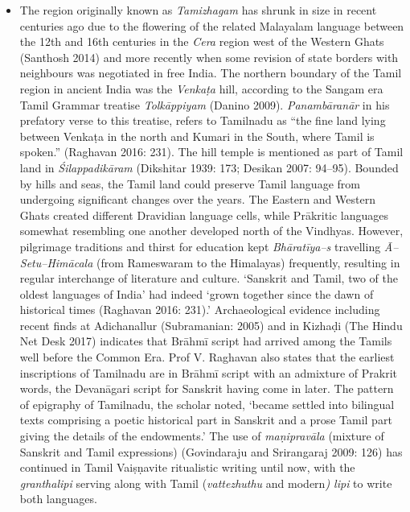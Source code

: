 \begin{itemize}
\item The region originally known as \textit{Tamizhagam} has shrunk in size in recent centuries ago due to the flowering of the related Malayalam language between the 12th and 16th centuries in the \textit{Cera} region west of the Western Ghats (Santhosh 2014) and more recently when some revision of state borders with neighbours was negotiated in free India. The northern boundary of the Tamil region in ancient India was the \textit{Venkaṭa} hill, according to the Sangam era Tamil Grammar treatise \textit{Tolkāppiyam} (Danino 2009). \textit{Panambāranār} in his prefatory verse to this treatise, refers to Tamilnadu as “the fine land lying between Venkaṭa in the north and Kumari in the South, where Tamil is spoken.” (Raghavan 2016: 231). The hill temple is mentioned as part of Tamil land in \textit{Śilappadikāram} (Dikshitar 1939: 173; Desikan 2007: 94–95). Bounded by hills and seas, the Tamil land could preserve Tamil language from undergoing significant changes over the years. The Eastern and Western Ghats created different Dravidian language cells, while Prākritic languages somewhat resembling one another developed north of the Vindhyas. However, pilgrimage traditions and thirst for education kept \textit{Bhāratīya–s} travelling \textit{Ā–Setu–Himācala} (from Rameswaram to the Himalayas) frequently, resulting in regular interchange of literature and culture. ‘Sanskrit and Tamil, two of the oldest languages of India’ had indeed ‘grown together since the dawn of historical times (Raghavan 2016: 231).’ Archaeological evidence including recent finds at Adichanallur (Subramanian: 2005) and in Kizhaḍi (The Hindu Net Desk 2017) indicates that Brāhmī script had arrived among the Tamils well before the Common Era. Prof V. Raghavan also states that the earliest inscriptions of Tamilnadu are in Brāhmī script with an admixture of Prakrit words, the Devanāgari script for Sanskrit having come in later. The pattern of epigraphy of Tamilnadu, the scholar noted, ‘became settled into bilingual texts comprising a poetic historical part in Sanskrit and a prose Tamil part giving the details of the endowments.’ The use of \textit{maṇipravāla} (mixture of Sanskrit and Tamil expressions) (Govindaraju and Srirangaraj 2009: 126) has continued in Tamil Vaiṣṇavite ritualistic writing until now, with the \textit{granthalipi} serving along with Tamil (\textit{vattezhuthu} and modern\textit{) lipi} to write both languages.

\end{itemize}


